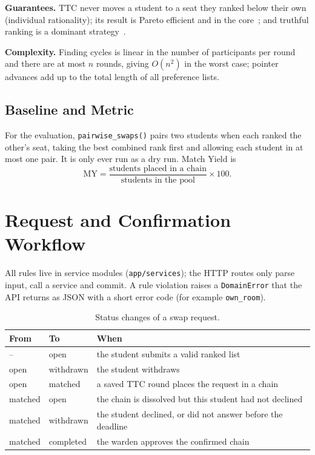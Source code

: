 \documentclass{tietreport}
\begin{document}
\textbf{Guarantees.} TTC never moves a student to a seat they ranked
below their own (individual rationality); its result is Pareto
efficient and in the core~\cite{shapley1974cores, roth1977weak}; and
truthful ranking is a dominant strategy~\cite{roth1982incentive}.

\textbf{Complexity.} Finding cycles is linear in the number of
participants per round and there are at most $n$ rounds, giving
$O(n^2)$ in the worst case; pointer advances add up to the total
length of all preference lists.

\subsection{Baseline and Metric}

For the evaluation, \texttt{pairwise\_swaps()} pairs two students
when each ranked the other's seat, taking the best combined rank first
and allowing each student in at most one pair. It is only ever run as
a dry run. Match Yield is
\[
  \mathrm{MY} = \frac{\text{students placed in a chain}}{\text{students in the pool}} \times 100.
\]

\section{Request and Confirmation Workflow}

All rules live in service modules (\texttt{app/services}); the HTTP
routes only parse input, call a service and commit. A rule violation
raises a \texttt{DomainError} that the API returns as JSON with a
short error code (for example \texttt{own\_room}).

\begin{table}[H]
\centering
\begin{tabularx}{\textwidth}{@{}llL@{}}
\toprule
\textbf{From} & \textbf{To} & \textbf{When} \\
\midrule
-- & open & the student submits a valid ranked list \\
open & withdrawn & the student withdraws \\
open & matched & a saved TTC round places the request in a chain \\
matched & open & the chain is dissolved but this student had not declined \\
matched & withdrawn & the student declined, or did not answer before the deadline \\
matched & completed & the warden approves the confirmed chain \\
\bottomrule
\end{tabularx}
\caption{Status changes of a swap request.}
\end{table}
\end{document}
